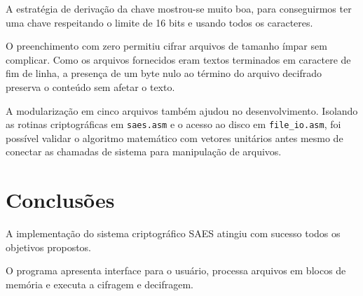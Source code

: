 \documentclass[12pt,a4paper]{article}
\begin{document}
A estratégia de derivação da chave mostrou-se muito boa, para conseguirmos ter uma chave respeitando o limite de 16 bits e usando todos os caracteres.

O preenchimento com zero permitiu cifrar arquivos de tamanho ímpar sem complicar. Como os arquivos fornecidos eram textos terminados em caractere de fim de linha, a presença de um byte nulo ao término do arquivo decifrado preserva o conteúdo sem afetar o texto.

A modularização em cinco arquivos também ajudou no desenvolvimento. Isolando as rotinas criptográficas em \texttt{saes.asm} e o acesso ao disco em \texttt{file\_io.asm}, foi possível validar o algoritmo matemático com vetores unitários antes mesmo de conectar as chamadas de sistema para manipulação de arquivos.

\section{Conclusões}

A implementação do sistema criptográfico SAES atingiu com sucesso todos os objetivos propostos.

O programa apresenta interface para o usuário, processa arquivos em blocos de memória e executa a cifragem e decifragem.
\end{document}
